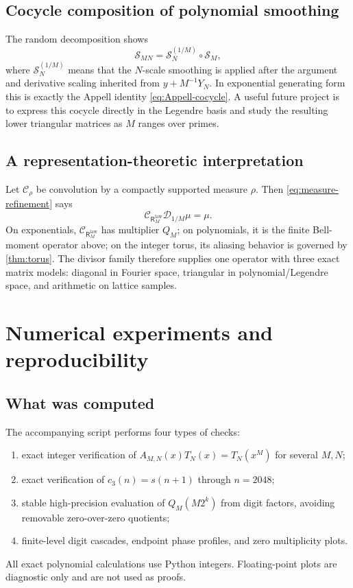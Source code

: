 \documentclass[11pt,oneside]{article}
\theoremstyle{definition}
\theoremstyle{remark}
\newcommand{\D}{\mathcal D}
\newcommand{\ReciprocalIntegerLaw}[1]{\mathsf R^{\mathrm{law}}_{#1}}
\begin{document}
\subsection{Cocycle composition of polynomial smoothing}

The random decomposition shows
\begin{equation}
 \mathcal S_{MN}=\mathcal S_N^{(1/M)}\circ\mathcal S_M,
 \label{eq:S-cocycle-informal}
\end{equation}
where $\mathcal S_N^{(1/M)}$ means that the $N$-scale smoothing is applied after the
argument and derivative scaling inherited from $y+M^{-1}Y_N$.  In exponential generating
form this is exactly the Appell identity \eqref{eq:Appell-cocycle}.  A useful future project
is to express this cocycle directly in the Legendre basis and study the resulting lower
triangular matrices as $M$ ranges over primes.

\subsection{A representation-theoretic interpretation}

Let $\mathcal C_{\rho}$ be convolution by a compactly supported measure $\rho$.  Then
\eqref{eq:measure-refinement} says
\begin{equation}
 \mathcal C_{\ReciprocalIntegerLaw{M}}\D_{1/M}\mu=\mu.
 \label{eq:convolution-intertwiner}
\end{equation}
On exponentials, $\mathcal C_{\ReciprocalIntegerLaw{M}}$ has multiplier $Q_M$; on polynomials, it is the
finite Bell-moment operator above; on the integer torus, its aliasing behavior is governed by
\cref{thm:torus}.  The divisor family therefore supplies one operator with three exact
matrix models: diagonal in Fourier space, triangular in polynomial/Legendre space, and
arithmetic on lattice samples.

\section{Numerical experiments and reproducibility}
\label{sec:numerics}

\subsection{What was computed}

The accompanying script  performs four types of checks:
\begin{enumerate}
\item exact integer verification of
$A_{M,N}(x)T_N(x)=T_N(x^M)$ for several $M,N$;
\item exact verification of $c_3(n)=s(n+1)$ through $n=2048$;
\item stable high-precision evaluation of $Q_M(M2^k)$ from digit factors, avoiding
removable zero-over-zero quotients;
\item finite-level digit cascades, endpoint phase profiles, and zero multiplicity plots.
\end{enumerate}
All exact polynomial calculations use Python integers.  Floating-point plots are diagnostic
only and are not used as proofs.
\end{document}
